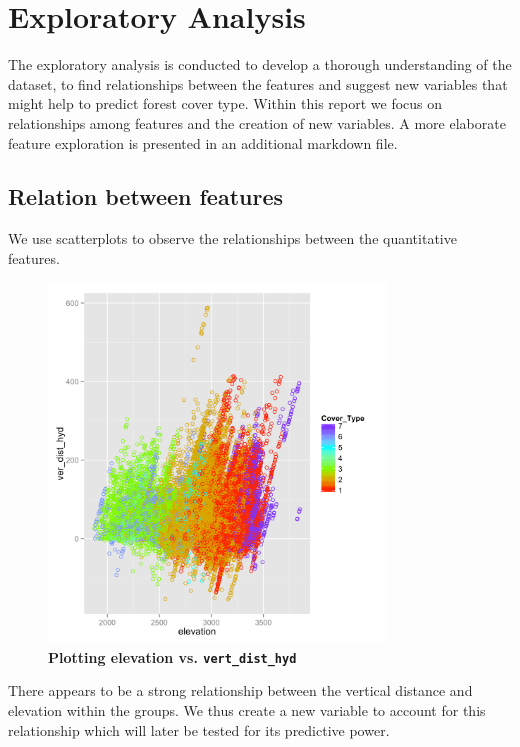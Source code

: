 \documentclass[paper=a4, fontsize=12pt]{scrartcl}
\numberwithin{equation}{section}
\numberwithin{figure}{section}
\numberwithin{table}{section}
\begin{document}
\newpage
\section{Exploratory Analysis}
The exploratory analysis is conducted to develop a thorough understanding of the dataset, to find relationships between the features and suggest new variables that might help to predict forest cover type. Within this report we focus on relationships among features and the creation of new variables. A more elaborate feature exploration is presented in an additional markdown file.

\subsection{Relation between features}
We use scatterplots to observe the relationships between the quantitative features.\\

\begin{figure}[H]
    \centering
    \includegraphics[width=0.8\textwidth]{elevation_ver.png}
    \caption{ \textbf{Plotting elevation vs. \lstinline{vert_dist_hyd}}}
    \label{fig:errors}
\end{figure}

There appears to be a strong relationship between the vertical distance and elevation within the groups. We thus create a new variable to account for this relationship which will later be tested for its predictive power. \\
\end{document}
